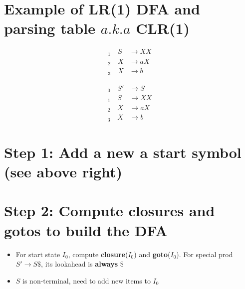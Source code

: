\documentclass[10pt,a4paper,landscape]{article}
\begin{document}
\pagestyle{empty}
\begin{multicols*}{3}
% 
% 

\section*{Example of LR(1) DFA and parsing table $a.k.a$ CLR(1)}
\begin{minipage}{.5\linewidth}
\begin{align*}
  _1\quad S&\to XX \\
  _2\quad X&\to aX \\
  _3\quad X&\to b
\end{align*}
\end{minipage}
\begin{minipage}{.5\linewidth}
\begin{align*}
  _0\quad S'&\to S \\
  _1\quad S&\to XX \\
  _2\quad X&\to aX \\
  _3\quad X&\to b
\end{align*}
\end{minipage}
\section*{Step 1: Add a new a start symbol (see above right)}
\section*{Step 2: Compute closures and gotos to build the DFA}
\begin{itemize}
\item For start state $I_0$, compute \textbf{closure}($I_0$) and \textbf{goto}($I_0$). For special prod $S'\to S\$$, its lookahead is \textbf{always} \$
\begin{minipage}{\linewidth}
  \centering
\end{minipage}
\item $S$ is non-terminal, need to add new items to $I_0$



\end{itemize}
\end{multicols*}
\end{document}
